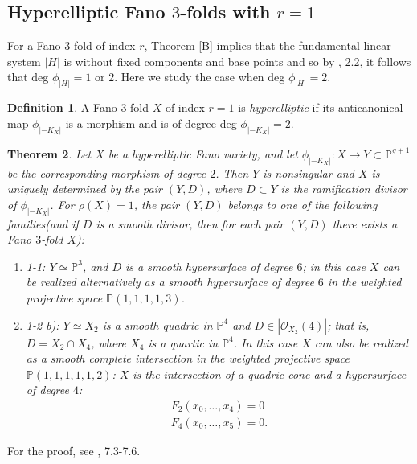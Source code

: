 \documentclass[11pt]{amsart}
\theoremstyle{plain}
\newtheorem{theorem}{Theorem}[section]
\theoremstyle{definition}
\newtheorem{definition}[theorem]{Definition}
\theoremstyle{expl}
\begin{document}
\subsection{Hyperelliptic Fano $3$-folds with $r=1$}
For a Fano $3$-fold of index $r$, Theorem \ref{B} implies that the fundamental linear system $|H|$ is without fixed components and base points and so by \cite{Isk77}, 2.2, it follows that deg $\phi_{|H|} =1$ or $2$. Here we study the case when deg $\phi_{|H|}=2$. 
\begin{definition}
    A Fano $3$-fold $X$ of index $r=1$ is \textit{hyperelliptic} if its anticanonical map $\phi_{|-K_X|}$ is a morphism and is of degree deg $\phi_{|-K_X|} = 2$.
\end{definition}
\begin{theorem}
    Let $X$ be a hyperelliptic Fano variety, and let $\phi_{|-K_X|} : X \to Y \subset \mathbb{P}^{g+1}$ be the corresponding morphism of degree $2$. Then $Y$ is nonsingular and $X$ is uniquely determined by the pair $(Y,D)$, where $D\subset Y$ is the ramification divisor of $\phi_{|-K_X|}$. For $\rho(X)=1$, 
    the pair $(Y,D)$ belongs to one of the following families(and if $D$ is a smooth divisor, then for each pair $(Y,D)$ there exists a Fano $3$-fold $X$):
    \begin{enumerate}
        \item[(i)] 1-1: $Y \simeq \mathbb{P}^3$, and $D$ is a smooth hypersurface of degree $6$; in this case $X$ can be realized alternatively as a smooth hypersurface of degree $6$ in the weighted projective space $\mathbb{P}(1,1,1,1,3)$. 
        \item[(ii)] 1-2 b): $Y \simeq X_2$ is a smooth quadric in $\mathbb{P}^4$ and $D \in |\mathcal{O}_{X_2}(4)|$; that is, $D = X_2 \cap X_4$, where $X_4$ is a quartic in $\mathbb{P}^4$. In this case $X$ can also be realized as a smooth complete intersection in the weighted projective space $\mathbb{P}(1,1,1,1,1,2)$: $X$ is the intersection of a quadric cone and a hypersurface of degree $4$:
        \begin{gather*}
        F_2(x_0,  \dots , x_4)=0 \\
        F_4(x_0, \dots , x_5)=0.
        \end{gather*}
    \end{enumerate}
\end{theorem}
For the proof, see \cite{Isk77}, 7.3-7.6.
\end{document}
